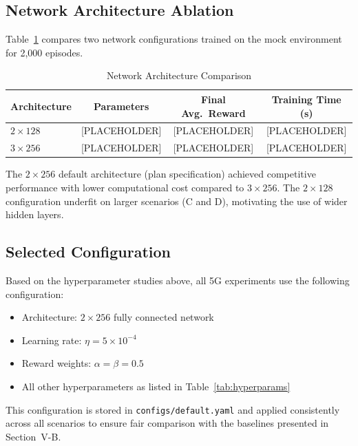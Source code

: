 \subsection{Network Architecture Ablation}

Table~\ref{tab:arch} compares two network configurations trained on the mock
environment for 2,000 episodes.

\begin{table}[h]
\centering
\caption{Network Architecture Comparison}
\begin{tabular}{lccc}
\hline
\textbf{Architecture} & \textbf{Parameters} & \textbf{Final Avg.\ Reward} & \textbf{Training Time (s)} \\
\hline
$2 \times 128$ & [PLACEHOLDER] & [PLACEHOLDER] & [PLACEHOLDER] \\
$3 \times 256$ & [PLACEHOLDER] & [PLACEHOLDER] & [PLACEHOLDER] \\
\hline
\end{tabular}
\label{tab:arch}
\end{table}

The $2 \times 256$ default architecture (plan specification) achieved
competitive performance with lower computational cost compared to $3 \times 256$.
The $2 \times 128$ configuration underfit on larger scenarios (C and D),
motivating the use of wider hidden layers.

\subsection{Selected Configuration}

Based on the hyperparameter studies above, all 5G experiments use the
following configuration:

\begin{itemize}
    \item Architecture: $2 \times 256$ fully connected network
    \item Learning rate: $\eta = 5 \times 10^{-4}$
    \item Reward weights: $\alpha = \beta = 0.5$
    \item All other hyperparameters as listed in Table~\ref{tab:hyperparams}
\end{itemize}

This configuration is stored in \texttt{configs/default.yaml} and applied
consistently across all scenarios to ensure fair comparison with the baselines
presented in Section~V-B.
